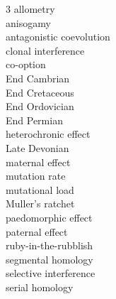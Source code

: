 
\begin{multicols}{3}
allometry \\
anisogamy \\
antagonistic coevolution \\
clonal interference \\
co-option \\
End Cambrian \\
End Cretaceous \\
End Ordovician \\
End Permian \\
heterochronic effect \\
Late Devonian \\
maternal effect\\
mutation rate \\
mutational load \\
Muller's ratchet\\
paedomorphic effect\\
paternal effect\\
ruby-in-the-rubblish \\
segmental homology\\
selective interference \\
serial homology\\
\end{multicols}

